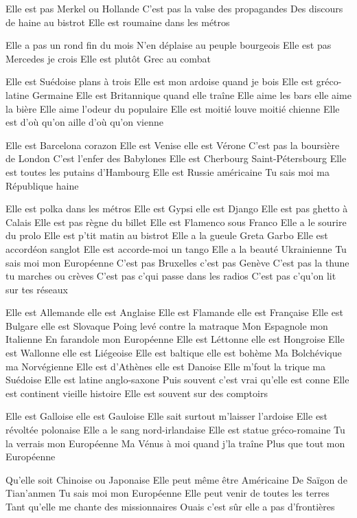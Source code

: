 \beginverse
Elle est pas Merkel ou Hollande
C’est pas la valse des propagandes
Des discours de haine au bistrot
Elle est roumaine dans les métros
\endverse

\beginverse
Elle a pas un rond fin du mois
N’en déplaise au peuple bourgeois
Elle est pas Mercedes je crois
Elle est plutôt Grec au combat
\endverse

\beginverse
Elle est Suédoise plans à trois
Elle est mon ardoise quand je bois
Elle est gréco-latine Germaine
Elle est Britannique quand elle traîne
Elle aime les bars elle aime la bière
Elle aime l’odeur du populaire
Elle est moitié louve moitié chienne
Elle est d’où qu’on aille d’où qu’on vienne
\endverse

\beginverse
Elle est Barcelona corazon
Elle est Venise elle est Vérone
C’est pas la boursière de London
C’est l’enfer des Babylones
Elle est Cherbourg Saint-Pétersbourg
Elle est toutes les putains d’Hambourg
Elle est Russie américaine
Tu sais moi ma République haine
\endverse

\beginverse
Elle est polka dans les métros
Elle est Gypsi elle est Django
Elle est pas ghetto à Calais
Elle est pas règne du billet
Elle est Flamenco sous Franco
Elle a le sourire du prolo
Elle est p’tit matin au bistrot
Elle a la gueule Greta Garbo
Elle est accordéon sanglot
Elle est accorde-moi un tango
Elle a la beauté Ukrainienne
Tu sais moi mon Européenne
C’est pas Bruxelles c’est pas Genève
C’est pas la thune tu marches ou crèves
C’est pas c’qui passe dans les radios
C’est pas c’qu’on lit sur tes réseaux
\endverse

\beginverse
Elle est Allemande elle est Anglaise
Elle est Flamande elle est Française
Elle est Bulgare elle est Slovaque
Poing levé contre la matraque
Mon Espagnole mon Italienne
En farandole mon Européenne
Elle est Léttonne elle est Hongroise
Elle est Wallonne elle est Liégeoise
Elle est baltique elle est bohème
Ma Bolchévique ma Norvégienne
Elle est d’Athènes elle est Danoise
Elle m’fout la trique ma Suédoise
Elle est latine anglo-saxone
Puis souvent c’est vrai qu’elle est conne
Elle est continent vieille histoire
Elle est souvent sur des comptoirs
\endverse

\beginverse
Elle est Galloise elle est Gauloise
Elle sait surtout m’laisser l’ardoise
Elle est révoltée polonaise
Elle a le sang nord-irlandaise
Elle est statue gréco-romaine
Tu la verrais mon Européenne
Ma Vénus à moi quand j’la traîne
Plus que tout mon Européenne
\endverse

\beginverse
Qu’elle soit Chinoise ou Japonaise
Elle peut même être Américaine
De Saïgon de Tian’anmen
Tu sais moi mon Européenne
Elle peut venir de toutes les terres
Tant qu’elle me chante des missionnaires
Ouais c’est sûr elle a pas d’frontières
\endverse

